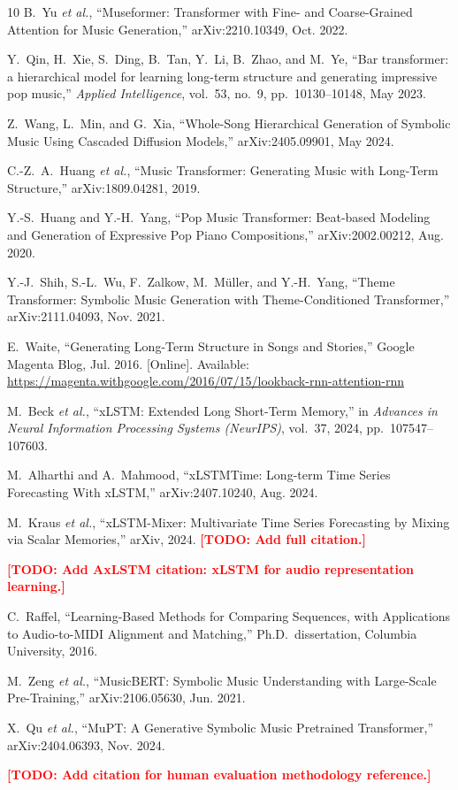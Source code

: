 \documentclass[conference]{IEEEtran}
\newcommand{\TODO}[1]{\textcolor{red}{\textbf{[TODO: #1]}}}
\begin{document}
\begin{thebibliography}{10}
B.~Yu \textit{et al.},
``Museformer: Transformer with Fine- and Coarse-Grained Attention for Music Generation,''
arXiv:2210.10349, Oct. 2022.

Y.~Qin, H.~Xie, S.~Ding, B.~Tan, Y.~Li, B.~Zhao, and M.~Ye,
``Bar transformer: a hierarchical model for learning long-term structure
and generating impressive pop music,''
\textit{Applied Intelligence}, vol.~53, no.~9, pp.~10130--10148, May 2023.

Z.~Wang, L.~Min, and G.~Xia,
``Whole-Song Hierarchical Generation of Symbolic Music Using Cascaded Diffusion Models,''
arXiv:2405.09901, May 2024.

C.-Z.~A.~Huang \textit{et al.},
``Music Transformer: Generating Music with Long-Term Structure,''
arXiv:1809.04281, 2019.

Y.-S.~Huang and Y.-H.~Yang,
``Pop Music Transformer: Beat-based Modeling and Generation of Expressive
Pop Piano Compositions,''
arXiv:2002.00212, Aug. 2020.

Y.-J.~Shih, S.-L.~Wu, F.~Zalkow, M.~M{\"u}ller, and Y.-H.~Yang,
``Theme Transformer: Symbolic Music Generation with Theme-Conditioned Transformer,''
arXiv:2111.04093, Nov. 2021.

E.~Waite,
``Generating Long-Term Structure in Songs and Stories,''
Google Magenta Blog, Jul. 2016.
[Online]. Available: \url{https://magenta.withgoogle.com/2016/07/15/lookback-rnn-attention-rnn}

M.~Beck \textit{et al.},
``xLSTM: Extended Long Short-Term Memory,''
in \textit{Advances in Neural Information Processing Systems (NeurIPS)},
vol.~37, 2024, pp.~107547--107603.

M.~Alharthi and A.~Mahmood,
``xLSTMTime: Long-term Time Series Forecasting With xLSTM,''
arXiv:2407.10240, Aug. 2024.

M.~Kraus \textit{et al.},
``xLSTM-Mixer: Multivariate Time Series Forecasting by Mixing via Scalar
Memories,''
arXiv, 2024. \TODO{Add full citation.}

\TODO{Add AxLSTM citation: xLSTM for audio representation learning.}

C.~Raffel,
``Learning-Based Methods for Comparing Sequences, with Applications to
Audio-to-MIDI Alignment and Matching,''
Ph.D.\ dissertation, Columbia University, 2016.

M.~Zeng \textit{et al.},
``MusicBERT: Symbolic Music Understanding with Large-Scale Pre-Training,''
arXiv:2106.05630, Jun. 2021.

X.~Qu \textit{et al.},
``MuPT: A Generative Symbolic Music Pretrained Transformer,''
arXiv:2404.06393, Nov. 2024.

\TODO{Add citation for human evaluation methodology reference.}

\end{thebibliography}
\end{document}
